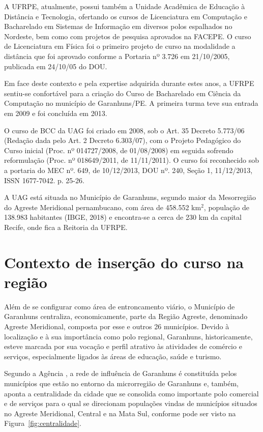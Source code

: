 \documentclass[
	12pt,				%
	openright,			%
  oneside,     %
	a4paper,			%
	chapter=TITLE,		%
	english,			%
	french,				%
	spanish,			%
	brazil				%
	]{abntex2}
\begin{document}
A UFRPE, atualmente, possui também a Unidade Acadêmica de Educação à Distância e Tecnologia, ofertando os cursos de Licenciatura em Computação e Bacharelado em Sistemas de Informação em diversos polos espalhados no Nordeste, bem como com projetos de pesquisa aprovados na FACEPE. O curso de Licenciatura em Física foi o primeiro projeto de curso na modalidade a distância que foi aprovado conforme a Portaria nº 3.726 em 21/10/2005, publicada em 24/10/05 do DOU.

Em face deste contexto e pela expertise adquirida durante estes anos, a UFRPE sentiu-se confortável para a criação do Curso de Bacharelado em Ciência da Computação no município de Garanhuns/PE. A primeira turma teve sua entrada em 2009 e foi concluída em 2013. 

O curso de BCC da UAG foi criado em 2008, sob o Art. 35 Decreto 5.773/06 (Redação dada pelo Art. 2 Decreto 6.303/07), com o Projeto Pedagógico do Curso inicial (Proc. nº 014727/2008, de 01/08/2008) em seguida sofrendo reformulação (Proc. nº 018649/2011, de 11/11/2011). O curso foi reconhecido sob a portaria do MEC nº. 649, de 10/12/2013, DOU nº. 240, Seção 1, 11/12/2013, ISSN 1677-7042. p. 25-26.

A UAG está situada no Município de Garanhuns, segundo maior da Mesorregião do Agreste Meridional pernambucano, com área de 458.552 km$^2$, população de 138.983 habitantes (IBGE, 2018) e encontra-se a cerca de 230 km da capital Recife, onde fica a Reitoria da UFRPE.

\section{Contexto de inserção do curso na região}

Além de se configurar como área de entroncamento viário, o Município de Garanhuns centraliza, economicamente, parte da Região Agreste, denominado Agreste Meridional, composta por esse e outros 26 municípios. Devido à  localização  e  à  sua  importância como polo regional, Garanhuns, historicamente, esteve marcada por sua vocação e perfil atrativo às atividades de comércio e serviços, especialmente ligados às áreas de educação, saúde e turismo.

Segundo a Agência \cite{fidem2017agencia}, a rede de influência de Garanhuns é constituída pelos municípios que estão no entorno da microrregião de Garanhuns e, também, aponta a centralidade da cidade que se consolida como importante polo comercial e de serviços para o qual se direcionam populações vindas de municípios situados no Agreste Meridional, Central e na Mata Sul, conforme pode ser visto na Figura~\ref{fig:centralidade}.
\end{document}
